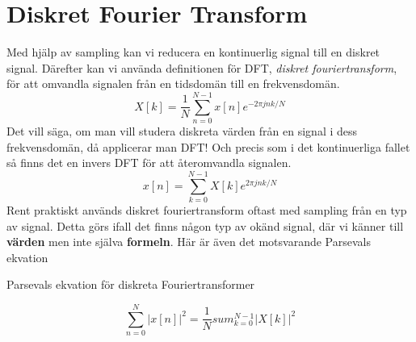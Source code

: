 \documentclass{article}
\begin{document}
\section{Diskret Fourier Transform}
Med hjälp av sampling kan vi reducera en kontinuerlig signal till en diskret signal. Därefter kan vi använda definitionen för DFT, \emph{diskret fouriertransform}, för att omvandla signalen från en tidsdomän till en frekvensdomän.
\[X[k] = \frac{1}{N} \sum_{n=0}^{N-1} x[n] e^{-2 \pi j n k/N}\]
Det vill säga, om man vill studera diskreta värden från en signal i dess frekvensdomän, då applicerar man DFT! Och precis som i det kontinuerliga fallet så finns det en invers DFT för att återomvandla signalen.
\[x[n] = \sum_{k=0}^{N-1} X[k] e^{2 \pi j n k/N} \] %
Rent praktiskt används diskret fouriertransform oftast med sampling från en typ av signal. Detta görs ifall det finns någon typ av okänd signal, där vi känner till \textbf{värden} men inte själva \textbf{formeln}. %
Här är även det motsvarande Parsevals ekvation

Parsevals ekvation för diskreta Fouriertransformer

\[\sum_{n=0}^{N} |x[n]|^2 = \frac{1}{N} sum_{k=0}^{N-1} |X[k]|^2 \]
\end{document}
